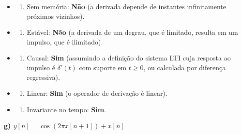 \begin{itemize}
\tightlist
\item
  \begin{enumerate}
  \def\labelenumi{(\roman{enumi})}
  \tightlist
  \item
    Sem memória: \textbf{Não} (a derivada depende de instantes infinitamente próximos vizinhos).
  \end{enumerate}
\item
  \begin{enumerate}
  \def\labelenumi{(\roman{enumi})}
  \setcounter{enumi}{1}
  \tightlist
  \item
    Estável: \textbf{Não} (a derivada de um degrau, que é limitado, resulta em um impulso, que é ilimitado).
  \end{enumerate}
\item
  \begin{enumerate}
  \def\labelenumi{(\roman{enumi})}
  \setcounter{enumi}{2}
  \tightlist
  \item
    Causal: \textbf{Sim} (assumindo a definição do sistema LTI cuja resposta ao impulso é \(\delta'(t)\) com suporte em \(t \ge 0\), ou calculada por diferença regressiva).
  \end{enumerate}
\item
  \begin{enumerate}
  \def\labelenumi{(\roman{enumi})}
  \setcounter{enumi}{3}
  \tightlist
  \item
    Linear: \textbf{Sim} (o operador de derivação é linear).
  \end{enumerate}
\item
  \begin{enumerate}
  \def\labelenumi{(\alph{enumi})}
  \setcounter{enumi}{21}
  \tightlist
  \item
    Invariante no tempo: \textbf{Sim}.
  \end{enumerate}
\end{itemize}

\textbf{g) \(y[n] = \cos(2\pi x[n+1]) + x[n]\)}

